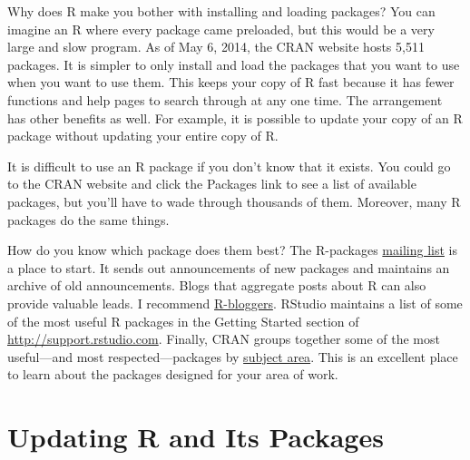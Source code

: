 \documentclass[
  letterpaper,
  DIV=11,
  numbers=noendperiod]{scrbook}
\begin{document}
Why does R make you bother with installing and loading packages? You can
imagine an R where every package came preloaded, but this would be a
very large and slow program. As of May 6, 2014, the CRAN website hosts
5,511 packages. It is simpler to only install and load the packages that
you want to use when you want to use them. This keeps your copy of R
fast because it has fewer functions and help pages to search through at
any one time. The arrangement has other benefits as well. For example,
it is possible to update your copy of an R package without updating your
entire copy of R.

\begin{tcolorbox}[enhanced jigsaw, breakable, colback=white, colbacktitle=quarto-callout-tip-color!10!white, arc=.35mm, bottomrule=.15mm, coltitle=black, left=2mm, rightrule=.15mm, colframe=quarto-callout-tip-color-frame, leftrule=.75mm, opacitybacktitle=0.6, bottomtitle=1mm, toptitle=1mm, titlerule=0mm, opacityback=0, title=\textcolor{quarto-callout-tip-color}{\faLightbulb}\hspace{0.5em}{What's the best way to learn about R packages?}, toprule=.15mm]

It is difficult to use an R package if you don't know that it exists.
You could go to the CRAN website and click the Packages link to see a
list of available packages, but you'll have to wade through thousands of
them. Moreover, many R packages do the same things.

How do you know which package does them best? The R-packages
\href{http://stat.ethz.ch/mailman/listinfo/r-packages}{mailing list} is
a place to start. It sends out announcements of new packages and
maintains an archive of old announcements. Blogs that aggregate posts
about R can also provide valuable leads. I recommend
\href{www.r-bloggers.com}{R-bloggers}. RStudio maintains a list of some
of the most useful R packages in the Getting Started section of
\url{http://support.rstudio.com}. Finally, CRAN groups together some of
the most useful---and most respected---packages by
\href{http://cran.r-project.org/web/views}{subject area}. This is an
excellent place to learn about the packages designed for your area of
work.

\end{tcolorbox}

\chapter{Updating R and Its Packages}\label{sec-appendix-updating}
\end{document}
